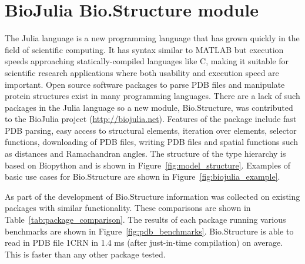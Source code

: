 \section*{BioJulia Bio.Structure module}
\label{sec:appendices_biojulia}

The Julia language \cite{Bezanson2017} is a new programming language that has grown quickly in the field of scientific computing.
It has syntax similar to MATLAB but execution speeds approaching statically-compiled languages like C, making it suitable for scientific research applications where both usability and execution speed are important.
Open source software packages to parse PDB files and manipulate protein structures exist in many programming languages.
There are a lack of such packages in the Julia language so a new module, Bio.Structure, was contributed to the BioJulia project (\url{http://biojulia.net}).
Features of the package include fast PDB parsing, easy access to structural elements, iteration over elements, selector functions, downloading of PDB files, writing PDB files and spatial functions such as distances and Ramachandran angles.
The structure of the type hierarchy is based on Biopython \cite{Cock2009} and is shown in Figure~\ref{fig:model_structure}.
Examples of basic use cases for Bio.Structure are shown in Figure~\ref{fig:biojulia_example}.

As part of the development of Bio.Structure information was collected on existing packages with similar functionality.
These comparisons are shown in Table~\ref{tab:package_comparison}.
The results of each package running various benchmarks are shown in Figure~\ref{fig:pdb_benchmarks}.
Bio.Structure is able to read in PDB file 1CRN in 1.4 ms (after just-in-time compilation) on average.
This is faster than any other package tested.


